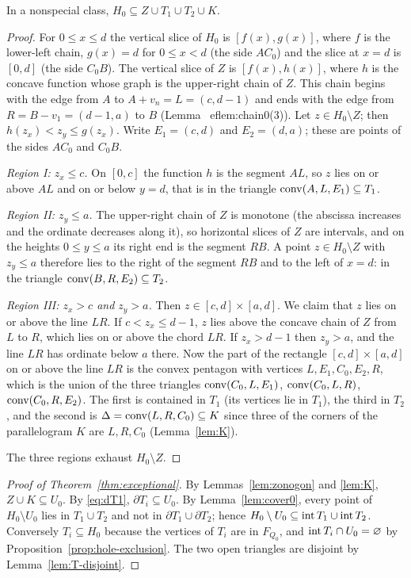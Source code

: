 \begin{lemma}[Covering of $H_0$]\label{lem:cover0}
In a nonspecial class, $H_0\subseteq Z\cup T_1\cup T_2\cup K$.
\end{lemma}
\begin{proof}
For $0\le x\le d$ the vertical slice of $H_0$ is $[f(x),g(x)]$, where $f$ is the lower-left chain, $g(x)=d$ for $0\le x<d$ (the side $AC_0$) and the slice at $x=d$ is $[0,d]$ (the side $C_0B$). The vertical slice of $Z$ is $[f(x),h(x)]$, where $h$ is the concave function whose graph is the upper-right chain of $Z$. This chain begins with the edge from $A$ to $A+v_n=L=(c,d-1)$ and ends with the edge from $R=B-v_1=(d-1,a)$ to $B$ (Lemma~
ef{lem:chain0}(3)). Let $z\in H_0\setminus Z$; then $h(z_x)<z_y\le g(z_x)$. Write $E_1=(c,d)$ and $E_2=(d,a)$; these are points of the sides $AC_0$ and $C_0B$.

\emph{Region I: $z_x\le c$.} On $[0,c]$ the function $h$ is the segment $AL$, so $z$ lies on or above $AL$ and on or below $y=d$, that is in the triangle $\operatorname{conv}(A,L,E_1)\subseteq T_1$.

\emph{Region II: $z_y\le a$.} The upper-right chain of $Z$ is monotone (the abscissa increases and the ordinate decreases along it), so horizontal slices of $Z$ are intervals, and on the heights $0\le y\le a$ its right end is the segment $RB$. A point $z\in H_0\setminus Z$ with $z_y\le a$ therefore lies to the right of the segment $RB$ and to the left of $x=d$: in the triangle $\operatorname{conv}(B,R,E_2)\subseteq T_2$.

\emph{Region III: $z_x>c$ and $z_y>a$.} Then $z\in[c,d]\times[a,d]$. We claim that $z$ lies on or above the line $LR$. If $c<z_x\le d-1$, $z$ lies above the concave chain of $Z$ from $L$ to $R$, which lies on or above the chord $LR$. If $z_x>d-1$ then $z_y>a$, and the line $LR$ has ordinate below $a$ there. Now the part of the rectangle $[c,d]\times[a,d]$ on or above the line $LR$ is the convex pentagon with vertices $L,E_1,C_0,E_2,R$, which is the union of the three triangles $\operatorname{conv}(C_0,L,E_1)$, $\operatorname{conv}(C_0,L,R)$, $\operatorname{conv}(C_0,R,E_2)$. The first is contained in $T_1$ (its vertices lie in $T_1$), the third in $T_2$, and the second is $\Delta=\operatorname{conv}(L,R,C_0)\subseteq K$ since three of the corners of the parallelogram $K$ are $L,R,C_0$ (Lemma~\ref{lem:K}).

The three regions exhaust $H_0\setminus Z$.
\end{proof}

\begin{proof}[Proof of Theorem~\ref{thm:exceptional}]
By Lemmas~\ref{lem:zonogon} and \ref{lem:K}, $Z\cup K\subseteq U_0$. By \eqref{eq:dT1}, $\partial T_i\subseteq U_0$. By Lemma~\ref{lem:cover0}, every point of $H_0\setminus U_0$ lies in $T_1\cup T_2$ and not in $\partial T_1\cup\partial T_2$; hence $H_0\setminus U_0\subseteq\operatorname{int} T_1\cup\operatorname{int} T_2$. Conversely $T_i\subseteq H_0$ because the vertices of $T_i$ are in $F_{Q_0}$, and $\operatorname{int} T_i\cap U_0=\varnothing$ by Proposition~\ref{prop:hole-exclusion}. The two open triangles are disjoint by Lemma~\ref{lem:T-disjoint}.
\end{proof}

